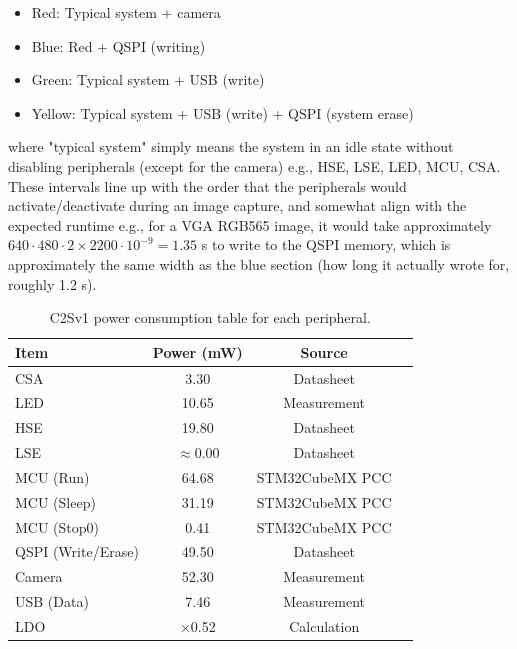 \begin{itemize}
    \item Red: Typical system + camera
    \item Blue: Red + QSPI (writing)
    \item Green: Typical system + USB (write)
    \item Yellow: Typical system + USB (write) + QSPI (system erase)
\end{itemize}

where "typical system" simply means the system in an idle state without disabling peripherals (except for the camera) e.g., HSE, LSE, LED, MCU, CSA. These intervals line up with the order that the peripherals would activate/deactivate during an image capture, and somewhat align with the expected runtime e.g., for a VGA RGB565 image, it would take approximately $640\cdot480\cdot2 \times 2200\cdot10^{-9} = 1.35$ s to write to the QSPI memory, which is approximately the same width as the blue section (how long it actually wrote for, roughly 1.2 s).

\begin{table}[htbp]
    \centering
    \begin{tabular}{|l|c|c|l|}
        \hline
        \textbf{Item} & \textbf{Power (mW)} & \textbf{Source} \\ \hline
        CSA & 3.30 & Datasheet \\ \hline
        LED & 10.65 & Measurement \\ \hline
        HSE & 19.80 & Datasheet \\ \hline
        LSE & $\approx$0.00 & Datasheet \\ \hline
        MCU (Run) & 64.68 & STM32CubeMX PCC \\ \hline
        MCU (Sleep) & 31.19 & STM32CubeMX PCC \\ \hline
        MCU (Stop0) & 0.41 & STM32CubeMX PCC \\ \hline
        QSPI (Write/Erase) & 49.50 & Datasheet \\ \hline
        Camera & 52.30 & Measurement \\ \hline
        USB (Data) & 7.46 & Measurement \\ \hline
        LDO & $\times$0.52 & Calculation \\ \hline
    \end{tabular}
    \caption{C2Sv1 power consumption table for each peripheral.}
    \label{tab:v1-power}
\end{table}

